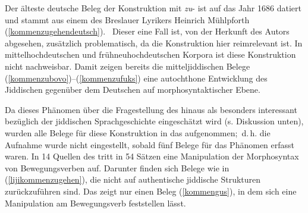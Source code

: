 

Der älteste deutsche Beleg der Konstruktion mit \textit{zu}- ist auf das Jahr 1686 datiert und stammt aus einem  des Breslauer Lyrikers Heinrich Mühlpforth (\ref{kommenzugehendeutsch}). \,%
 Dieser eine Fall ist, von der Herkunft des Autors abgesehen, zusätzlich problematisch, da die Konstruktion hier reimrelevant ist. In mittelhochdeutschen und frühneuhochdeutschen Korpora ist diese Konstruktion nicht nachweisbar. Damit zeigen bereits die mitteljiddischen Belege (\ref{kommenzubovo})–(\ref{kommenzufuks})  eine autochthone Entwicklung des Jiddischen gegenüber dem Deutschen auf morphosyntaktischer Ebene. 




Da dieses Phänomen über die Fragestellung des \hai{{\LiJi}} hinaus als besonders interessant bezüglich der jiddischen Sprachgeschichte eingeschätzt wird (s. Diskussion unten), wurden alle Belege für diese Konstruktion in das  aufgenommen;\, d.\,h. die Aufnahme wurde nicht eingestellt, sobald fünf Belege für das Phänomen erfasst waren. In 14 Quellen des  tritt in 54 Sätzen eine Manipulation der Morphosyntax von Bewegungsverben auf. Darunter finden sich Belege wie in (\ref{lijikommenzugehen}), die nicht auf authentische jiddische Strukturen zurückzuführen sind. Das  zeigt nur einen Beleg (\ref{kommengus}), in dem sich eine Manipulation am Bewegungsverb feststellen lässt.

